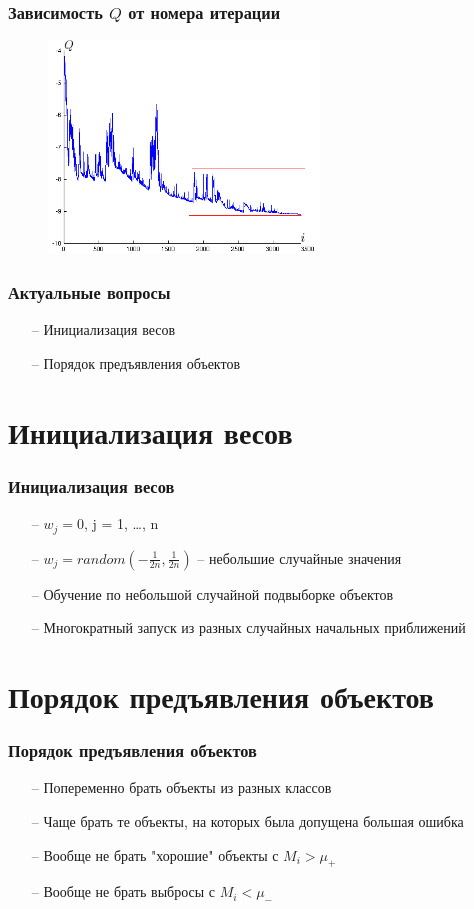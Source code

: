 \documentclass[10pt]{beamer}
\begin{document}
\begin{frame}\frametitle{Зависимость $Q$ от номера итерации}
	\begin{figure}[htbp]
	  \includegraphics[height=160pt, keepaspectratio = true]{images/stochastic_gradient1}
	\end{figure}
\end{frame}

\begin{frame}\frametitle{Актуальные вопросы}
	\begin{itemize} [<+->]
		\item[--] Инициализация весов
		\item[--] Порядок предъявления объектов
	\end{itemize}
\end{frame}

\section{Инициализация весов}

\begin{frame}\frametitle{Инициализация весов}
	\begin{itemize}
		\item[--] $w_j = 0$, j = 1, \dots, n
		\item[--] $w_j = random(-\frac{1}{2n}, \frac{1}{2n})$ -- небольшие случайные значения
		\item[--] Обучение по небольшой случайной подвыборке объектов
		\item[--] Многократный запуск из разных случайных начальных приближений
	\end{itemize}
\end{frame}

\section{Порядок предъявления объектов}

\begin{frame}\frametitle{Порядок предъявления объектов}
	\begin{itemize}
		\item[--] Попеременно брать объекты из разных классов
		\item[--] Чаще брать те объекты, на которых была допущена большая ошибка
		\item[--] Вообще не брать "хорошие" объекты с $M_i > \mu_+$
		\item[--] Вообще не брать выбросы с $M_i < \mu_-$
	\end{itemize}
\end{frame}
\end{document}
